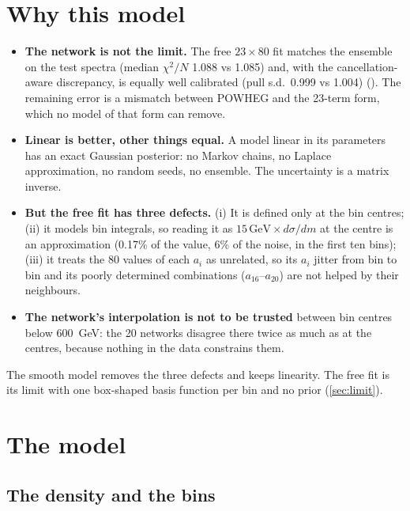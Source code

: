 \tableofcontents

\section{Why this model}
\label{sec:why}

\begin{itemize}
  \item \textbf{The network is not the limit.} The free $23\times80$ fit matches the ensemble
    on the test spectra (median $\chi^2/N$ 1.088 vs 1.085) and, with the cancellation-aware
    discrepancy, is equally well calibrated (pull s.d.\ 0.999 vs 1.004)
    (). The remaining error is a mismatch between
    POWHEG and the 23-term form, which no model of that form can remove.
  \item \textbf{Linear is better, other things equal.} A model linear in its parameters has an
    exact Gaussian posterior: no Markov chains, no Laplace approximation, no random seeds, no
    ensemble. The uncertainty is a matrix inverse.
  \item \textbf{But the free fit has three defects.} (i) It is defined only at the bin
    centres; (ii) it models bin integrals, so reading it as $15\,\text{GeV}\times
    d\sigma/dm$ at the centre is an approximation (0.17\% of the value, 6\% of the noise, in
    the first ten bins); (iii) it treats the 80 values of each $a_i$ as unrelated, so its
    $a_i$ jitter from bin to bin and its poorly determined combinations
    ($a_{16}$--$a_{20}$) are not helped by their neighbours.
  \item \textbf{The network's interpolation is not to be trusted} between bin centres below
    600~GeV: the 20 networks disagree there twice as much as at the centres, because nothing
    in the data constrains them.
\end{itemize}

The smooth model removes the three defects and keeps linearity. The free fit is its limit
with one box-shaped basis function per bin and no prior (\cref{sec:limit}).

\section{The model}
\label{sec:model}

\subsection{The density and the bins}

